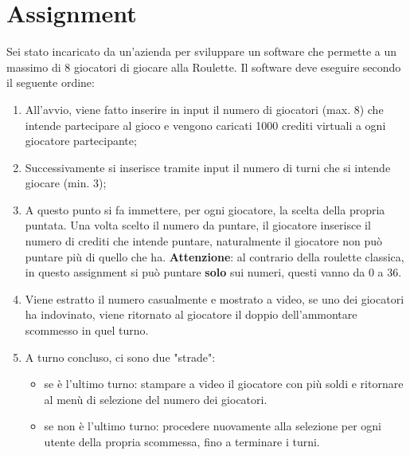 \documentclass[addpoints]{exam}
\begin{document}
    \section{Assignment}
    Sei stato incaricato da un'azienda per sviluppare un software che permette a un massimo di 8 giocatori di giocare alla Roulette. Il software deve eseguire secondo il seguente ordine:
    \begin{enumerate}
        \item All'avvio, viene fatto inserire in input il numero di giocatori (max. 8) che intende partecipare al gioco e vengono caricati 1000 crediti virtuali a ogni giocatore partecipante;
        \item Successivamente si inserisce tramite input il numero di turni che si intende giocare (min. 3);
        \item A questo punto si fa immettere, per ogni giocatore, la scelta della propria puntata. Una volta scelto il numero da puntare, il giocatore inserisce il numero di crediti che intende puntare, naturalmente il giocatore non può puntare più di quello che ha.
        \textbf{Attenzione}: al contrario della roulette classica, in questo assignment si può puntare \textbf{solo} sui numeri, questi vanno da 0 a 36.
        \item Viene estratto il numero casualmente e mostrato a video, se uno dei giocatori ha indovinato, viene ritornato al giocatore il doppio dell'ammontare scommesso in quel turno.
        \item A turno concluso, ci sono due "strade":
        \begin{itemize}
            \item se è l'ultimo turno: stampare a video il giocatore con più soldi e ritornare al menù di selezione del numero dei giocatori.
            \item se non è l'ultimo turno: procedere nuovamente alla selezione per ogni utente della propria scommessa, fino a terminare i turni.
        \end{itemize}
    \end{enumerate}
\end{document}
